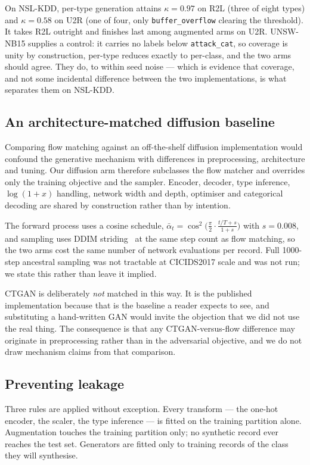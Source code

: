 \documentclass[11pt]{article}
\begin{document}
On NSL-KDD, per-type generation attains $\kappa = 0.97$ on R2L (three of eight types)
and $\kappa = 0.58$ on U2R (one of four, only \texttt{buffer\_overflow} clearing the
threshold). It takes R2L outright and finishes last among augmented arms on U2R.
UNSW-NB15 supplies a control: it carries no labels below \texttt{attack\_cat}, so
coverage is unity by construction, per-type reduces exactly to per-class, and the
two arms should agree. They do, to within seed noise --- which is evidence that
coverage, and not some incidental difference between the two implementations, is
what separates them on NSL-KDD.

\subsection*{An architecture-matched diffusion baseline}

Comparing flow matching against an off-the-shelf diffusion implementation would
confound the generative mechanism with differences in preprocessing, architecture
and tuning. Our diffusion arm therefore subclasses the flow matcher and overrides
only the training objective and the sampler. Encoder, decoder, type inference,
$\log(1+x)$ handling, network width and depth, optimiser and categorical decoding
are shared by construction rather than by intention.

The forward process uses a cosine schedule,
$\bar{\alpha}_t = \cos^2\!\bigl(\tfrac{\pi}{2}\cdot\tfrac{t/T+s}{1+s}\bigr)$ with
$s=0.008$, and sampling uses DDIM striding~\cite{song2021ddim} at the same step count as flow matching,
so the two arms cost the same number of network evaluations per record. Full
1000-step ancestral sampling was not tractable at CICIDS2017 scale and was not run;
we state this rather than leave it implied.

CTGAN is deliberately \emph{not} matched in this way. It is the published
implementation because that is the baseline a reader expects to see, and
substituting a hand-written GAN would invite the objection that we did not use the
real thing. The consequence is that any CTGAN-versus-flow difference may originate
in preprocessing rather than in the adversarial objective, and we do not draw
mechanism claims from that comparison.

\subsection*{Preventing leakage}

Three rules are applied without exception. Every transform --- the one-hot encoder,
the scaler, the type inference --- is fitted on the training partition alone.
Augmentation touches the training partition only; no synthetic record ever reaches
the test set. Generators are fitted only to training records of the class they will
synthesise.
\end{document}
